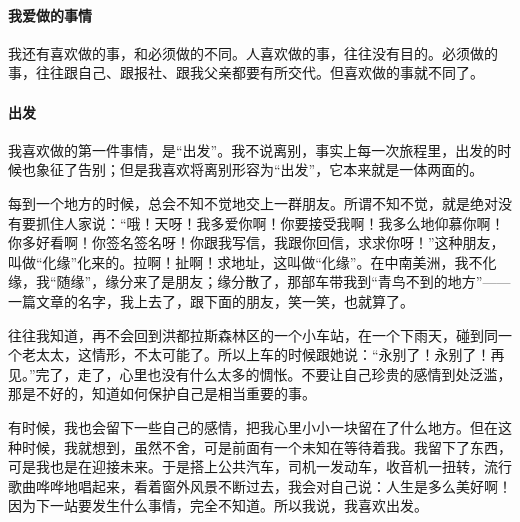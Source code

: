\paragraph*{我爱做的事情}
\par 我还有喜欢做的事，和必须做的不同。人喜欢做的事，往往没有目的。必须做的事，往往跟自己、跟报社、跟我父亲都要有所交代。但喜欢做的事就不同了。
\paragraph*{出发}
\par 我喜欢做的第一件事情，是“出发”。我不说离别，事实上每一次旅程里，出发的时候也象征了告别；但是我喜欢将离别形容为“出发”，它本来就是一体两面的。
\par 每到一个地方的时候，总会不知不觉地交上一群朋友。所谓不知不觉，就是绝对没有要抓住人家说：“哦！天呀！我多爱你啊！你要接受我啊！我多么地仰慕你啊！你多好看啊！你签名签名呀！你跟我写信，我跟你回信，求求你呀！”这种朋友，叫做“化缘”化来的。拉啊！扯啊！求地址，这叫做“化缘”。在中南美洲，我不化缘，我“随缘”，缘分来了是朋友；缘分散了，那部车带我到“青鸟不到的地方”——一篇文章的名字，我上去了，跟下面的朋友，笑一笑，也就算了。
\par 往往我知道，再不会回到洪都拉斯森林区的一个小车站，在一个下雨天，碰到同一个老太太，这情形，不太可能了。所以上车的时候跟她说：“永别了！永别了！再见。”完了，走了，心里也没有什么太多的惆怅。不要让自己珍贵的感情到处泛滥，那是不好的，知道如何保护自己是相当重要的事。
\par 有时候，我也会留下一些自己的感情，把我心里小小一块留在了什么地方。但在这种时候，我就想到，虽然不舍，可是前面有一个未知在等待着我。我留下了东西，可是我也是在迎接未来。于是搭上公共汽车，司机一发动车，收音机一扭转，流行歌曲哗哗地唱起来，看着窗外风景不断过去，我会对自己说：人生是多么美好啊！因为下一站要发生什么事情，完全不知道。所以我说，我喜欢出发。
